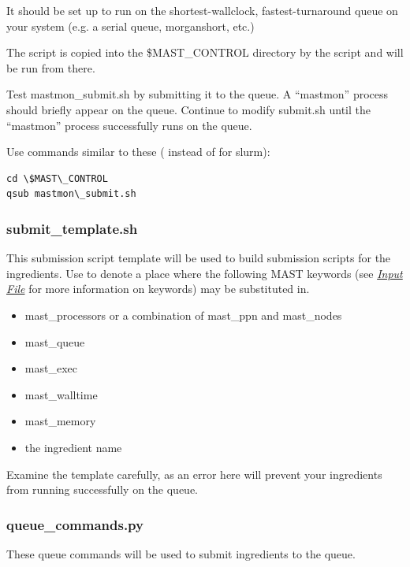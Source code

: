 \documentclass[letterpaper,10pt,english]{sphinxmanual}
\begin{document}
It should be set up to run on the shortest-wallclock, fastest-turnaround queue on your system (e.g. a serial queue, morganshort, etc.)

The script is copied into the \$MAST\_CONTROL directory by the  script and will be run from there.

Test mastmon\_submit.sh by submitting it to the queue. A ``mastmon'' process should briefly appear on the queue. Continue to modify submit.sh until the ``mastmon'' process successfully runs on the queue.

Use commands similar to these ( instead of  for slurm):

\begin{Verbatim}[commandchars=\\\{\}]
cd \$MAST\_CONTROL
qsub mastmon\_submit.sh
\end{Verbatim}


\subsubsection{submit\_template.sh}
\label{1_0_installation:submit-template-sh}
This submission script template will be used to build submission scripts for the ingredients. Use  to denote a place where the following MAST keywords (see {\hyperref[3_0_inputfile::doc]{\emph{Input File}}} for more information on keywords) may be substituted in.
\begin{itemize}
\item {} 
mast\_processors or a combination of mast\_ppn and mast\_nodes

\item {} 
mast\_queue

\item {} 
mast\_exec

\item {} 
mast\_walltime

\item {} 
mast\_memory

\item {} 
the ingredient name

\end{itemize}

Examine the template carefully, as an error here will prevent your ingredients from running successfully on the queue.


\subsubsection{queue\_commands.py}
\label{1_0_installation:queue-commands-py}
These queue commands will be used to submit ingredients to the queue.
\end{document}
